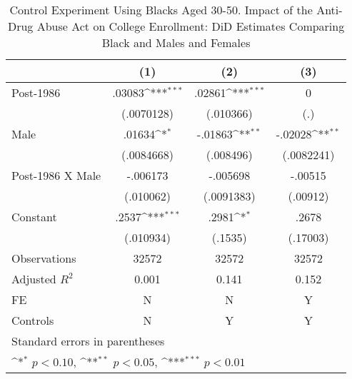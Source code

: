 \begin{table}[htbp]\centering
\def\sym#1{\ifmmode^{#1}\else\(^{#1}\)\fi}
\caption{Control Experiment Using Blacks Aged 30-50. Impact of the Anti-Drug Abuse Act on College Enrollment: DiD Estimates Comparing Black and Males and Females}
\begin{tabular}{l*{3}{c}}
\hline\hline
                    &\multicolumn{1}{c}{(1)}         &\multicolumn{1}{c}{(2)}         &\multicolumn{1}{c}{(3)}         \\
\hline
Post-1986           &      .03083\sym{***}&      .02861\sym{***}&           0         \\
                    &  (.0070128)         &   (.010366)         &         (.)         \\
[1em]
Male                &      .01634\sym{*}  &     -.01863\sym{**} &     -.02028\sym{**} \\
                    &  (.0084668)         &   (.008496)         &  (.0082241)         \\
[1em]
Post-1986 X Male    &    -.006173         &    -.005698         &     -.00515         \\
                    &   (.010062)         &  (.0091383)         &    (.00912)         \\
[1em]
Constant            &       .2537\sym{***}&       .2981\sym{*}  &       .2678         \\
                    &   (.010934)         &     (.1535)         &    (.17003)         \\
\hline
Observations        &       32572         &       32572         &       32572         \\
Adjusted \(R^{2}\)  &       0.001         &       0.141         &       0.152         \\
FE                  &           N         &           N         &           Y         \\
Controls            &           N         &           Y         &           Y         \\
\hline\hline
\multicolumn{4}{l}{\footnotesize Standard errors in parentheses}\\
\multicolumn{4}{l}{\footnotesize \sym{*} \(p<0.10\), \sym{**} \(p<0.05\), \sym{***} \(p<0.01\)}\\
\end{tabular}
\end{table}

